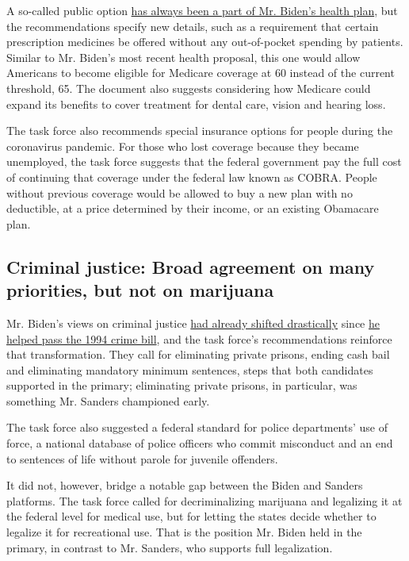 A so-called public option
\href{https://www.nytimes3xbfgragh.onion/2019/07/15/us/politics/biden-health-care.html}{has
always been a part of Mr. Biden's health plan}, but the recommendations
specify new details, such as a requirement that certain prescription
medicines be offered without any out-of-pocket spending by patients.
Similar to Mr. Biden's most recent health proposal, this one would allow
Americans to become eligible for Medicare coverage at 60 instead of the
current threshold, 65. The document also suggests considering how
Medicare could expand its benefits to cover treatment for dental care,
vision and hearing loss.

The task force also recommends special insurance options for people
during the coronavirus pandemic. For those who lost coverage because
they became unemployed, the task force suggests that the federal
government pay the full cost of continuing that coverage under the
federal law known as COBRA. People without previous coverage would be
allowed to buy a new plan with no deductible, at a price determined by
their income, or an existing Obamacare plan.

\hypertarget{criminal-justice-broad-agreement-on-many-priorities-but-not-on-marijuana}{%
\subsection{Criminal justice: Broad agreement on many priorities, but
not on
marijuana}\label{criminal-justice-broad-agreement-on-many-priorities-but-not-on-marijuana}}

Mr. Biden's views on criminal justice
\href{https://www.nytimes3xbfgragh.onion/2019/07/23/us/politics/biden-criminal-justice.html}{had
already shifted drastically} since
\href{https://www.nytimes3xbfgragh.onion/2019/06/25/us/joe-biden-crime-laws.html}{he
helped pass the 1994 crime bill}, and the task force's recommendations
reinforce that transformation. They call for eliminating private
prisons, ending cash bail and eliminating mandatory minimum sentences,
steps that both candidates supported in the primary; eliminating private
prisons, in particular, was something Mr. Sanders championed early.

The task force also suggested a federal standard for police departments'
use of force, a national database of police officers who commit
misconduct and an end to sentences of life without parole for juvenile
offenders.

It did not, however, bridge a notable gap between the Biden and Sanders
platforms. The task force called for decriminalizing marijuana and
legalizing it at the federal level for medical use, but for letting the
states decide whether to legalize it for recreational use. That is the
position Mr. Biden held in the primary, in contrast to Mr. Sanders, who
supports full legalization.

